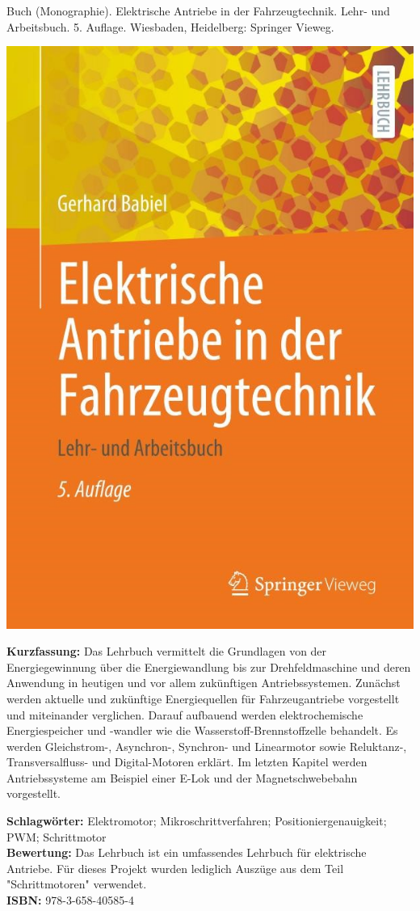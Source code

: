 {
Buch (Monographie). Elektrische Antriebe in der Fahrzeugtechnik. Lehr- und Arbeitsbuch.
5. Auflage. Wiesbaden, Heidelberg: Springer Vieweg.	
\begin{minipage}{0.38\textwidth}
	\includegraphics[width=\linewidth]{images/Babiel.jpg}
\end{minipage}
\hfill
\begin{minipage}{0.6\textwidth}
\textbf{Kurzfassung:}
Das Lehrbuch vermittelt die Grundlagen von der Energiegewinnung über die Energiewandlung bis zur Drehfeldmaschine und deren Anwendung in heutigen und vor allem zukünftigen Antriebssystemen. Zunächst werden aktuelle und zukünftige Energiequellen für Fahrzeugantriebe vorgestellt und miteinander verglichen. Darauf aufbauend werden elektrochemische Energiespeicher und -wandler wie die Wasserstoff-Brennstoffzelle behandelt. Es werden Gleichstrom-, Asynchron-, Synchron- und Linearmotor sowie Reluktanz-, Transversalfluss- und Digital-Motoren erklärt. Im letzten Kapitel werden Antriebssysteme am Beispiel einer E-Lok und der Magnetschwebebahn vorgestellt.
\end{minipage}
\textbf{Schlagwörter:}
Elektromotor; Mikroschrittverfahren; Positioniergenauigkeit; PWM; Schrittmotor
\\ \textbf{Bewertung:}
Das Lehrbuch ist ein umfassendes Lehrbuch für elektrische Antriebe. Für dieses Projekt wurden lediglich Auszüge aus dem Teil "Schrittmotoren" verwendet.
\\ \textbf{ISBN:}
978-3-658-40585-4
}

